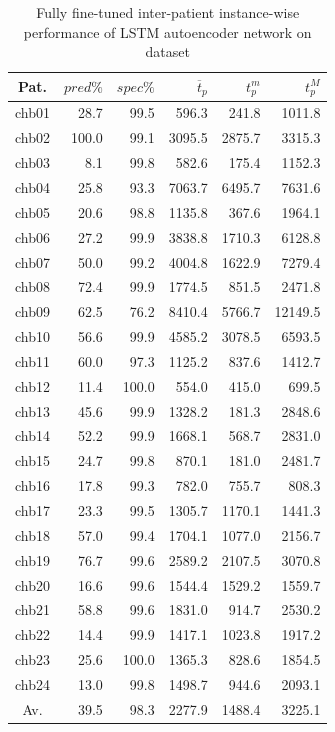 \begin{table}[ht]
    \centering
    \begin{tabular}{c|rrrrr}
    Pat.  & $pred\%$ & $spec\%$ & $\overline{t}_p$   & $t_p^m$  & $t_p^M$   \\ \hline
    chb01   & 28.7   & 99.5   & 596.3   & 241.8   & 1011.8  \\
    chb02   & 100.0  & 99.1   & 3095.5  & 2875.7  & 3315.3  \\
    chb03   & 8.1    & 99.8   & 582.6   & 175.4   & 1152.3  \\
    chb04   & 25.8   & 93.3   & 7063.7  & 6495.7  & 7631.6  \\
    chb05   & 20.6   & 98.8   & 1135.8  & 367.6   & 1964.1  \\
    chb06   & 27.2   & 99.9   & 3838.8  & 1710.3  & 6128.8  \\
    chb07   & 50.0   & 99.2   & 4004.8  & 1622.9  & 7279.4  \\
    chb08   & 72.4   & 99.9   & 1774.5  & 851.5   & 2471.8  \\
    chb09   & 62.5   & 76.2   & 8410.4  & 5766.7  & 12149.5 \\
    chb10   & 56.6   & 99.9   & 4585.2  & 3078.5  & 6593.5  \\
    chb11   & 60.0   & 97.3   & 1125.2  & 837.6   & 1412.7  \\
    chb12   & 11.4   & 100.0  & 554.0   & 415.0   & 699.5   \\
    chb13   & 45.6   & 99.9   & 1328.2  & 181.3   & 2848.6  \\
    chb14   & 52.2   & 99.9   & 1668.1  & 568.7   & 2831.0  \\
    chb15   & 24.7   & 99.8   & 870.1   & 181.0   & 2481.7  \\
    chb16   & 17.8   & 99.3   & 782.0   & 755.7   & 808.3   \\
    chb17   & 23.3   & 99.5   & 1305.7  & 1170.1  & 1441.3  \\
    chb18   & 57.0   & 99.4   & 1704.1  & 1077.0  & 2156.7  \\
    chb19   & 76.7   & 99.6   & 2589.2  & 2107.5  & 3070.8  \\
    chb20   & 16.6   & 99.6   & 1544.4  & 1529.2  & 1559.7  \\
    chb21   & 58.8   & 99.6   & 1831.0  & 914.7   & 2530.2  \\
    chb22   & 14.4   & 99.9   & 1417.1  & 1023.8  & 1917.2  \\
    chb23   & 25.6   & 100.0  & 1365.3  & 828.6   & 1854.5  \\
    chb24   & 13.0   & 99.8   & 1498.7  & 944.6   & 2093.1  \\ \hline
    Av.     & 39.5   & 98.3   & 2277.9  & 1488.4  & 3225.1  \\ \hline
    \end{tabular}
    \caption{Fully fine-tuned inter-patient instance-wise performance of LSTM autoencoder network on  dataset}
    \label{tab:full-inter-patient-lstm-instance} 
\end{table}

